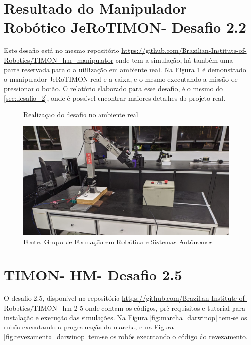 \section{Resultado do Manipulador Robótico JeRoTIMON- Desafio 2.2 }
\label{sec:desafio_2_2}
Este desafio está no mesmo repositório \url{https://github.com/Brazilian-Institute-of-Robotics/TIMON\_hm\_manipulator} onde tem a simulação, há também uma parte reservada para o a utilização em ambiente real. Na Figura \ref{fig:manipulador_real} é demonstrado o manipulador JeRoTIMON real e a caixa, e o mesmo executando a missão de pressionar o botão. O relatório elaborado para esse desafio, é o mesmo do \ref{sec:desafio_2}, onde é possível encontrar maiores detalhes do projeto real.



\begin{figure}[H]
    \caption{Realização do desafio no ambiente real}
    \centering
    \includegraphics[width= \textwidth]{Figures/manipulador_real.png}
    \caption*{Fonte: Grupo de Formação em Robótica e Sistemas Autônomos}
    \label{fig:manipulador_real}
\end{figure}



\section{TIMON- HM- Desafio 2.5}
\label{sec:desafio_2_5}
O desafio 2.5, disponível no repositório \url{https://github.com/Brazilian-Institute-of-Robotics/TIMON_hm-2-5} onde contam os códigos, pré-requisitos e tutorial para instalação e execução das simulações. Na Figura \ref{fig:marcha_darwinop} tem-se os robôs executando a programação da marcha, e na Figura \ref{fig:revezamento_darwinop} tem-se os robôs executando o código do revezamento.



